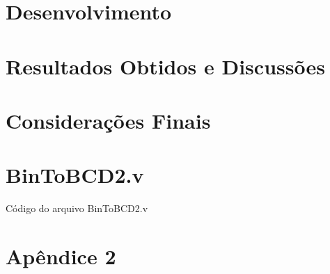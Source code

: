 \documentclass[
	12pt,				%
	openright,			%
	a4paper,			%
	english,			%
	french,				%
	spanish,			%
	brazil,				%
	]{abntex2}
\begin{document}
\chapter{Desenvolvimento}


\chapter{Resultados Obtidos e Discussões}


\chapter{Considerações Finais}





\postextual





\begin{apendicesenv}

\partapendices

\chapter{BinToBCD2.v}
\label{code:BinToBCD2.v}
Código do arquivo BinToBCD2.v
 

\chapter{Apêndice 2}


\end{apendicesenv}
\end{document}
